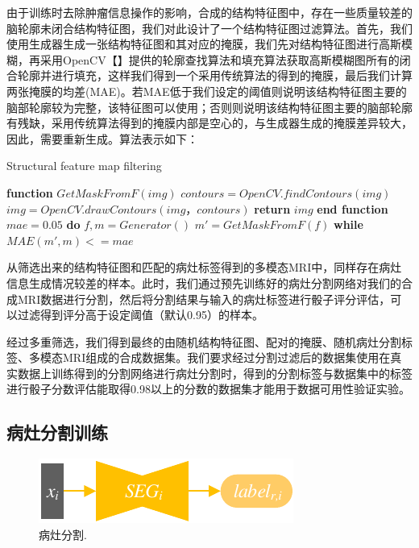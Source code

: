 \documentclass[letterpaper]{article} %
\begin{document}
由于训练时去除肿瘤信息操作的影响，合成的结构特征图中，存在一些质量较差的脑轮廓未闭合结构特征图，我们对此设计了一个结构特征图过滤算法。首先，我们使用生成器生成一张结构特征图和其对应的掩膜，我们先对结构特征图进行高斯模糊\cite{92wink2004denoising}，再采用OpenCV【】提供的轮廓查找算法和填充算法获取高斯模糊图所有的闭合轮廓并进行填充，这样我们得到一个采用传统算法的得到的掩膜，最后我们计算两张掩膜的均差(MAE)。若MAE低于我们设定的阈值则说明该结构特征图主要的脑部轮廓较为完整，该特征图可以使用；否则则说明该结构特征图主要的脑部轮廓有残缺，采用传统算法得到的掩膜内部是空心的，与生成器生成的掩膜差异较大，因此，需要重新生成。算法表示如下：
\begin{algorithm}
	\caption{Structural feature map filtering}
	\label{alg:3}
	\begin{algorithmic}[1]
		\State \textbf{function} $GetMaskFromF(img)$
		\State \indent$contours = OpenCV.findContours(img)$
		\State \indent$img =OpenCV.drawContours(img，contours)$
		\State \indent\textbf{return} $img$
		\State \textbf{end function}
		\State
		\State $mae=0.05$
		\State \textbf{do} 
		\State \indent$f, m = Generator()$
		\State \indent$m'= GetMaskFromF(f)$
		\State \textbf{while} $MAE(m',m) <= mae$
	\end{algorithmic}  
\end{algorithm}

从筛选出来的结构特征图和匹配的病灶标签得到的多模态MRI中，同样存在病灶信息生成情况较差的样本。此时，我们通过预先训练好的病灶分割网络对我们的合成MRI数据进行分割，然后将分割结果与输入的病灶标签进行骰子评分评估，可以过滤得到评分高于设定阈值（默认0.95）的样本。

经过多重筛选，我们得到最终的由随机结构特征图、配对的掩膜、随机病灶分割标签、多模态MRI组成的合成数据集。我们要求经过分割过滤后的数据集使用在真实数据上训练得到的分割网络进行病灶分割时，得到的分割标签与数据集中的标签进行骰子分数评估能取得0.98以上的分数的数据集才能用于数据可用性验证实验。

\subsection{病灶分割训练}
\begin{figure}
	\centering
	\includegraphics[width=0.6\columnwidth]{figures/segmentation}
	\caption{病灶分割.}
	\label{segmentation}
\end{figure}
\end{document}
